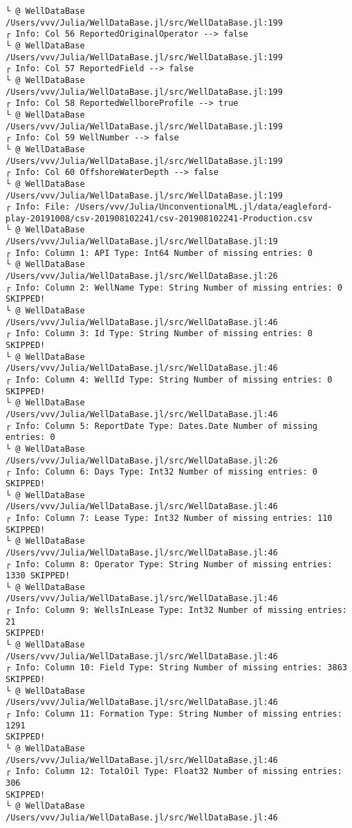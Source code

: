 \documentclass[11pt]{article}
\begin{document}
\begin{Verbatim}[commandchars=\\\{\}]
└ @ WellDataBase /Users/vvv/Julia/WellDataBase.jl/src/WellDataBase.jl:199
┌ Info: Col 56 ReportedOriginalOperator --> false
└ @ WellDataBase /Users/vvv/Julia/WellDataBase.jl/src/WellDataBase.jl:199
┌ Info: Col 57 ReportedField --> false
└ @ WellDataBase /Users/vvv/Julia/WellDataBase.jl/src/WellDataBase.jl:199
┌ Info: Col 58 ReportedWellboreProfile --> true
└ @ WellDataBase /Users/vvv/Julia/WellDataBase.jl/src/WellDataBase.jl:199
┌ Info: Col 59 WellNumber --> false
└ @ WellDataBase /Users/vvv/Julia/WellDataBase.jl/src/WellDataBase.jl:199
┌ Info: Col 60 OffshoreWaterDepth --> false
└ @ WellDataBase /Users/vvv/Julia/WellDataBase.jl/src/WellDataBase.jl:199
┌ Info: File: /Users/vvv/Julia/UnconventionalML.jl/data/eagleford-
play-20191008/csv-201908102241/csv-201908102241-Production.csv
└ @ WellDataBase /Users/vvv/Julia/WellDataBase.jl/src/WellDataBase.jl:19
┌ Info: Column 1: API Type: Int64 Number of missing entries: 0
└ @ WellDataBase /Users/vvv/Julia/WellDataBase.jl/src/WellDataBase.jl:26
┌ Info: Column 2: WellName Type: String Number of missing entries: 0 SKIPPED!
└ @ WellDataBase /Users/vvv/Julia/WellDataBase.jl/src/WellDataBase.jl:46
┌ Info: Column 3: Id Type: String Number of missing entries: 0 SKIPPED!
└ @ WellDataBase /Users/vvv/Julia/WellDataBase.jl/src/WellDataBase.jl:46
┌ Info: Column 4: WellId Type: String Number of missing entries: 0 SKIPPED!
└ @ WellDataBase /Users/vvv/Julia/WellDataBase.jl/src/WellDataBase.jl:46
┌ Info: Column 5: ReportDate Type: Dates.Date Number of missing entries: 0
└ @ WellDataBase /Users/vvv/Julia/WellDataBase.jl/src/WellDataBase.jl:26
┌ Info: Column 6: Days Type: Int32 Number of missing entries: 0 SKIPPED!
└ @ WellDataBase /Users/vvv/Julia/WellDataBase.jl/src/WellDataBase.jl:46
┌ Info: Column 7: Lease Type: Int32 Number of missing entries: 110 SKIPPED!
└ @ WellDataBase /Users/vvv/Julia/WellDataBase.jl/src/WellDataBase.jl:46
┌ Info: Column 8: Operator Type: String Number of missing entries: 1330 SKIPPED!
└ @ WellDataBase /Users/vvv/Julia/WellDataBase.jl/src/WellDataBase.jl:46
┌ Info: Column 9: WellsInLease Type: Int32 Number of missing entries: 21
SKIPPED!
└ @ WellDataBase /Users/vvv/Julia/WellDataBase.jl/src/WellDataBase.jl:46
┌ Info: Column 10: Field Type: String Number of missing entries: 3863 SKIPPED!
└ @ WellDataBase /Users/vvv/Julia/WellDataBase.jl/src/WellDataBase.jl:46
┌ Info: Column 11: Formation Type: String Number of missing entries: 1291
SKIPPED!
└ @ WellDataBase /Users/vvv/Julia/WellDataBase.jl/src/WellDataBase.jl:46
┌ Info: Column 12: TotalOil Type: Float32 Number of missing entries: 306
SKIPPED!
└ @ WellDataBase /Users/vvv/Julia/WellDataBase.jl/src/WellDataBase.jl:46

\end{Verbatim}
\end{document}
